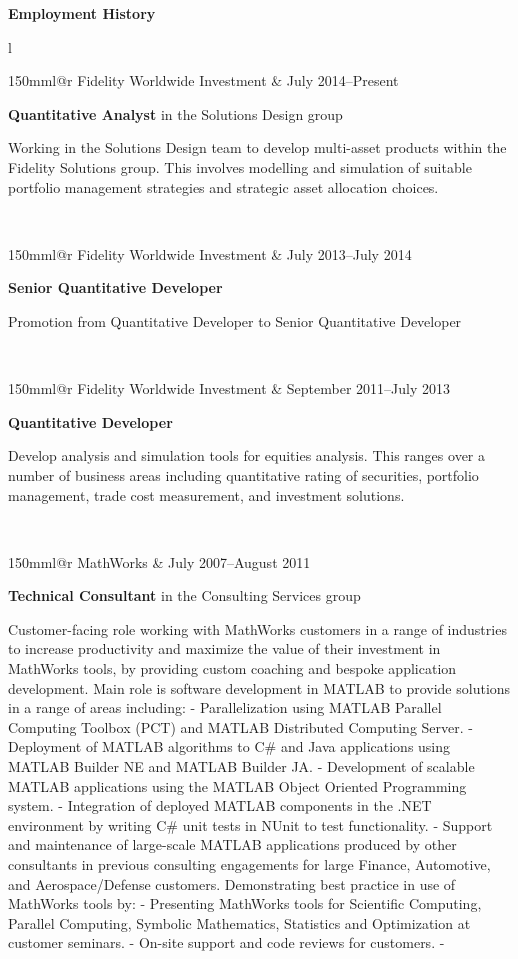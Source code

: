 \documentclass[10pt,a4paper]{article}
\makeatletter
\newcommand{\role}[6]{
\begin{tabular*}{150mm}{l@{\extracolsep{\fill}}r}
#5 & #1--#2 \\ 
\multicolumn{2}{p{140mm}}
{\textbf{#3}#4

#6} 
\end{tabular*}
\vspace{0.8mm}
 }
\makeatother
\begin{document}
\vspace{0.1in}
{\large \textbf{Employment History}}\\
\vspace{0.1in}
\begin{tabular}{l}
  \role{July 2014}{Present}{Quantitative Analyst}{ in the Solutions Design
  group}{Fidelity Worldwide Investment}
  {Working in the Solutions Design team
  to develop multi-asset products within the Fidelity Solutions group. This
  involves modelling and simulation of suitable portfolio management
  strategies and strategic asset allocation choices.}\\
  \role{July 2013}{July 2014}{Senior Quantitative Developer}{}
    {Fidelity Worldwide Investment}
    {Promotion from Quantitative Developer to Senior Quantitative Developer}\\
  \role{September 2011}{July 2013}{Quantitative Developer}{}
    {Fidelity Worldwide Investment}
    {Develop analysis and simulation tools for equities analysis. This
    ranges over a number of business areas
     including quantitative rating of securities, portfolio management,
     trade cost measurement, and investment
      solutions.}\\
  \role{July 2007}{August 2011}{Technical Consultant}{ in the Consulting
  Services group}{MathWorks}
    {Customer-facing role working with MathWorks customers in a range of
    industries to increase productivity and maximize the value of their
    investment in MathWorks tools, by providing custom coaching and bespoke
    application development. Main role is software development in MATLAB to
    provide solutions in a range of areas including: - Parallelization
    using MATLAB Parallel Computing Toolbox (PCT) and MATLAB Distributed
    Computing Server. - Deployment of MATLAB algorithms to C\# and Java
    applications using MATLAB Builder NE and MATLAB Builder JA. -
    Development of scalable MATLAB applications using the MATLAB Object
    Oriented Programming system. - Integration of deployed MATLAB
    components in the .NET environment by writing C\# unit tests in NUnit to
    test functionality. - Support and maintenance of large-scale MATLAB
    applications produced by other consultants in previous consulting
    engagements for large Finance, Automotive, and Aerospace/Defense
    customers. Demonstrating best practice in use of MathWorks tools by: -
    Presenting MathWorks tools for Scientific Computing, Parallel
    Computing, Symbolic Mathematics, Statistics and Optimization at
    customer seminars. - On-site support and code reviews for customers. -
}
\end{tabular}
\end{document}
